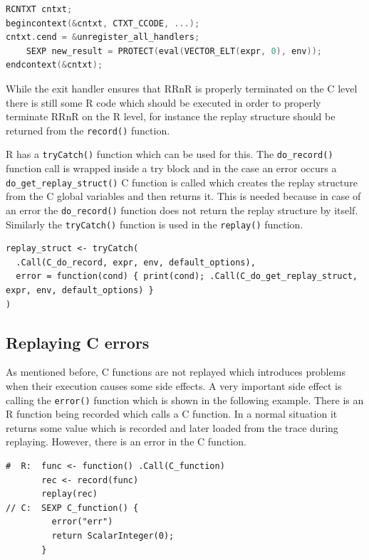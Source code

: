 \documentclass[thesis=M,english,hidelinks]{FITthesis}[2012/10/20]
\begin{document}
\begin{lstlisting}[style=filestyle, language=C, caption={Wrapping main expression evaluation into a context}]
RCNTXT cntxt;
begincontext(&cntxt, CTXT_CCODE, ...);
cntxt.cend = &unregister_all_handlers;
	SEXP new_result = PROTECT(eval(VECTOR_ELT(expr, 0), env));
endcontext(&cntxt);
\end{lstlisting}
		
		While the exit handler ensures that RRnR is properly terminated on the C level there is still some R code which should be executed in order to properly terminate RRnR on the R level, for instance the replay structure should be returned from the \lstinline|record()| function.\par
		
		R has a \lstinline|tryCatch()| function which can be used for this. The \lstinline|do_record()| function call is wrapped inside a try block and in the case an error occurs a \lstinline|do_get_replay_struct()| C function is called which creates the replay structure from the C global variables and then returns it. This is needed because in case of an error the \lstinline|do_record()| function does not return the replay structure by itself. Similarly the \lstinline|tryCatch()| function is used in the \lstinline|replay()| function.\par
		
\begin{lstlisting}[style=filestyle, caption={Handling errors in the \lstinline|record()| function}]
replay_struct <- tryCatch(
  .Call(C_do_record, expr, env, default_options),
  error = function(cond) { print(cond); .Call(C_do_get_replay_struct, expr, env, default_options) }
)
\end{lstlisting}
		
		\subsection{Replaying C errors}
		As mentioned before, C functions are not replayed which introduces problems when their execution causes some side effects. A very important side effect is calling the \lstinline|error()| function which is shown in the following example. There is an R function being recorded which calls a C function. In a normal situation it returns some value which is recorded and later loaded from the trace during replaying. However, there is an error in the C function.\par
		
\begin{lstlisting}[style=filestyle, caption={Example of an error in a C function that must be replayed}]
#  R:  func <- function() .Call(C_function)
       rec <- record(func)
       replay(rec)
// C:  SEXP C_function() {
         error("err")
         return ScalarInteger(0);
       }
\end{lstlisting}
\end{document}
